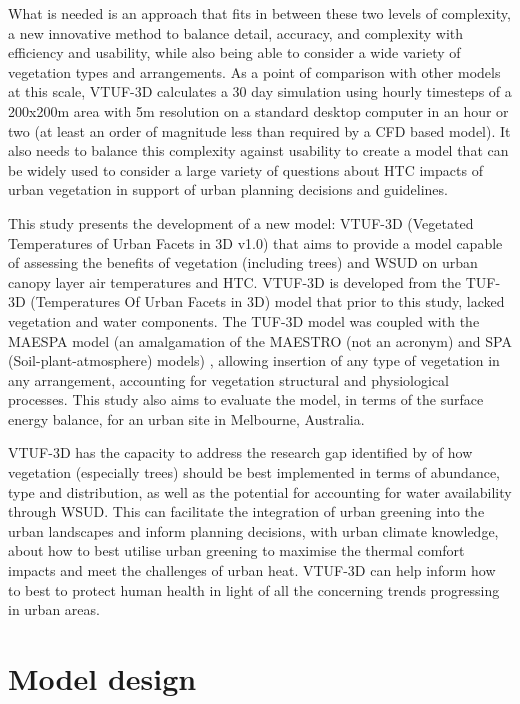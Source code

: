 \documentclass[final,3p,times,authoryear]{elsarticle}
\begin{document}
What is needed is an approach that fits in between these two levels of complexity, a new innovative method to balance detail, accuracy, and complexity with efficiency and usability, while also being able to consider a wide variety of vegetation types and arrangements. As a point of comparison with other models at this scale, VTUF-3D calculates a 30 day simulation using hourly timesteps of a 200x200m area with 5m resolution on a standard desktop computer in an hour or two (at least an order of magnitude less than required by a CFD based model). It also needs to balance this complexity against usability to create a model that can be widely used to consider a large variety of questions about HTC impacts of urban vegetation in support of urban planning decisions and guidelines. 

This study presents the development of a new model: VTUF-3D (Vegetated Temperatures of Urban Facets in 3D v1.0) that aims to provide a model capable of assessing the benefits of vegetation (including trees) and WSUD on urban canopy layer air temperatures and HTC. VTUF-3D is developed from the TUF-3D (Temperatures Of Urban Facets in 3D) model \citep{Krayenhoff2007} that prior to this study, lacked vegetation and water components. The TUF-3D model was coupled with the MAESPA model (an amalgamation of the MAESTRO (not an acronym) and SPA (Soil-plant-atmosphere) models)  \citep{Duursma2012}, allowing insertion of any type of vegetation in any arrangement, accounting for vegetation structural and physiological processes. This study also aims to evaluate the model, in terms of the surface energy balance, for an urban site in Melbourne, Australia. 

VTUF-3D has the capacity to address the research gap identified by \cite{Bowler2010} of how vegetation (especially trees) should be best implemented in terms of abundance, type and distribution, as well as the potential for accounting for water availability through WSUD. This can facilitate the integration of urban greening into the urban landscapes and inform planning decisions, with urban climate knowledge, about how to best utilise urban greening to maximise the thermal comfort impacts and meet the challenges of urban heat. VTUF-3D can help inform how to best to protect human health in light of all the concerning trends progressing in urban areas.

\section{Model design}\label{sec:method}
\end{document}
